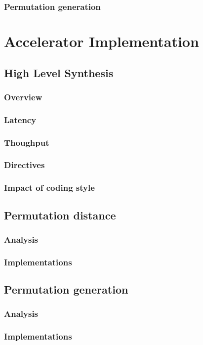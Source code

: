 \documentclass{iccmemoria}
\begin{document}
    \subsection{Permutation generation}

\chapter{Accelerator Implementation}
  \section{High Level Synthesis}
    \subsection{Overview}
    \subsection{Latency}
    \subsection{Thoughput}
    \subsection{Directives}
    \subsection{Impact of coding style}
  \section{Permutation distance}
    \subsection{Analysis}
    \subsection{Implementations}
  \section{Permutation generation}
    \subsection{Analysis}
    \subsection{Implementations}
\end{document}
